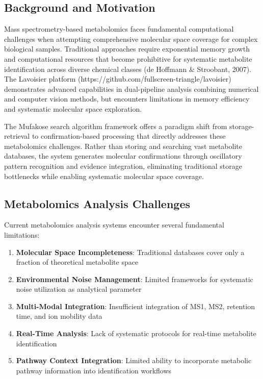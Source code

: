 \documentclass[12pt,a4paper]{article}
\begin{document}
\subsection{Background and Motivation}

Mass spectrometry-based metabolomics faces fundamental computational challenges when attempting comprehensive molecular space coverage for complex biological samples. Traditional approaches require exponential memory growth and computational resources that become prohibitive for systematic metabolite identification across diverse chemical classes (de Hoffmann \& Stroobant, 2007). The Lavoisier platform (https://github.com/fullscreen-triangle/lavoisier) demonstrates advanced capabilities in dual-pipeline analysis combining numerical and computer vision methods, but encounters limitations in memory efficiency and systematic molecular space exploration.

The Mufakose search algorithm framework offers a paradigm shift from storage-retrieval to confirmation-based processing that directly addresses these metabolomics challenges. Rather than storing and searching vast metabolite databases, the system generates molecular confirmations through oscillatory pattern recognition and evidence integration, eliminating traditional storage bottlenecks while enabling systematic molecular space coverage.

\subsection{Metabolomics Analysis Challenges}

Current metabolomics analysis systems encounter several fundamental limitations:

\begin{enumerate}
\item \textbf{Molecular Space Incompleteness}: Traditional databases cover only a fraction of theoretical metabolite space
\item \textbf{Environmental Noise Management}: Limited frameworks for systematic noise utilization as analytical parameter
\item \textbf{Multi-Modal Integration}: Insufficient integration of MS1, MS2, retention time, and ion mobility data
\item \textbf{Real-Time Analysis}: Lack of systematic protocols for real-time metabolite identification
\item \textbf{Pathway Context Integration}: Limited ability to incorporate metabolic pathway information into identification workflows
\end{enumerate}
\end{document}
